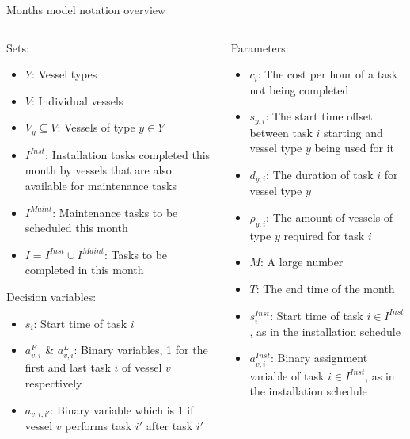 \documentclass{beamer}
\newcommand{\smallc}{\scriptsize}
\begin{document}
\begin{frame}{Months model notation overview}
\smallc
\begin{columns}
\begin{column}{.48\textwidth}
Sets:
\begin{itemize}
\item $Y$: Vessel types
\item $V$: Individual vessels
\item $V_y \subseteq V$: Vessels of type $y \in Y$ 
\item $I^{Inst}$:  Installation tasks completed this month by vessels that are also available for maintenance tasks
\item $I^{Maint}$: Maintenance tasks to be scheduled this month
\item $I = I^{Inst} \cup I^{Maint}$:  Tasks to be completed in this month
\end{itemize}

Decision variables:
\begin{itemize}
\item $s_i$: Start time of task $i$
\item $a^F_{v,i}$ \& $a^L_{v,i}$: Binary variables, 1 for the first and last task $i$ of vessel $v$ respectively
\item $a_{v,i,i'}$: Binary variable which is 1 if vessel $v$ performs task $i'$ after task $i'$
\end{itemize}
\end{column}

\hfill

\begin{column}{.48\textwidth}
Parameters:
\begin{itemize}
\item $c_i$: The cost per hour of a task not being completed
\item $s_{y,i}$: The start time offset between task $i$ starting and vessel type $y$ being used for it
\item $d_{y,i}$: The duration of task $i$ for vessel type $y$
\item $\rho_{y,i}$: The amount of vessels of type $y$ required for task $i$
\item $M$: A large number
\item $T$: The end time of the month
\item $s^{Inst}_i$: Start time of task $i \in I^{Inst}$, as in the installation schedule
\item $a^{Inst}_{v,i}$: Binary assignment variable of task $i \in I^{Inst}$, as in the installation schedule
\end{itemize}
\end{column}
\end{columns}
\end{frame}
\end{document}
